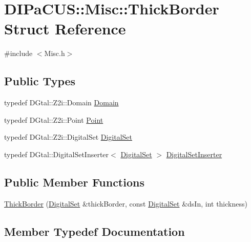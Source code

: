 \hypertarget{structDIPaCUS_1_1Misc_1_1ThickBorder}{}\section{D\+I\+Pa\+C\+US\+:\+:Misc\+:\+:Thick\+Border Struct Reference}
\label{structDIPaCUS_1_1Misc_1_1ThickBorder}


{\ttfamily \#include $<$Misc.\+h$>$}

\subsection*{Public Types}
\begin{DoxyCompactItemize}
\item 
typedef D\+Gtal\+::\+Z2i\+::\+Domain \mbox{\hyperlink{structDIPaCUS_1_1Misc_1_1ThickBorder_a06c1111877ee915840d29a376650fcb2}{Domain}}
\item 
typedef D\+Gtal\+::\+Z2i\+::\+Point \mbox{\hyperlink{structDIPaCUS_1_1Misc_1_1ThickBorder_ae295c13d112a91997154ec08edcbd01d}{Point}}
\item 
typedef D\+Gtal\+::\+Z2i\+::\+Digital\+Set \mbox{\hyperlink{structDIPaCUS_1_1Misc_1_1ThickBorder_a0fc2e5498fb6c524bebb4965338a9189}{Digital\+Set}}
\item 
typedef D\+Gtal\+::\+Digital\+Set\+Inserter$<$ \mbox{\hyperlink{structDIPaCUS_1_1Misc_1_1ThickBorder_a0fc2e5498fb6c524bebb4965338a9189}{Digital\+Set}} $>$ \mbox{\hyperlink{structDIPaCUS_1_1Misc_1_1ThickBorder_ae6b153aee7b5ce2c7aa5031fb2e237ea}{Digital\+Set\+Inserter}}
\end{DoxyCompactItemize}
\subsection*{Public Member Functions}
\begin{DoxyCompactItemize}
\item 
\mbox{\hyperlink{structDIPaCUS_1_1Misc_1_1ThickBorder_aab612b502416009a6ae33d36830de1d6}{Thick\+Border}} (\mbox{\hyperlink{structDIPaCUS_1_1Misc_1_1ThickBorder_a0fc2e5498fb6c524bebb4965338a9189}{Digital\+Set}} \&thick\+Border, const \mbox{\hyperlink{structDIPaCUS_1_1Misc_1_1ThickBorder_a0fc2e5498fb6c524bebb4965338a9189}{Digital\+Set}} \&ds\+In, int thickness)
\end{DoxyCompactItemize}


\subsection{Member Typedef Documentation}
\mbox{\label{structDIPaCUS_1_1Misc_1_1ThickBorder_a0fc2e5498fb6c524bebb4965338a9189}} 
